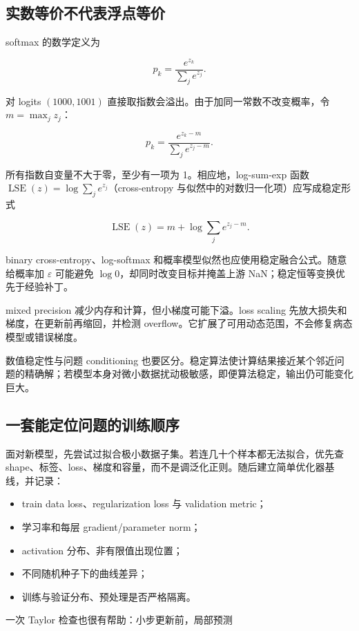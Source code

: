 \subsection{实数等价不代表浮点等价}

softmax 的数学定义为

\[
p_k=\frac{e^{z_k}}{\sum_je^{z_j}}.
\]

对 logits \((1000,1001)\) 直接取指数会溢出。由于加同一常数不改变概率，令 \(m=\max_jz_j\)：

\[
p_k
=\frac{e^{z_k-m}}{\sum_je^{z_j-m}}.
\]

所有指数自变量不大于零，至少有一项为 1。相应地，log-sum-exp 函数 \(\operatorname{LSE}(z)=\log\sum_je^{z_j}\)（cross-entropy 与似然中的对数归一化项）应写成稳定形式

\[
\operatorname{LSE}(z)
=m+\log\sum_je^{z_j-m}.
\]

binary cross-entropy、log-softmax 和概率模型似然也应使用稳定融合公式。随意给概率加 \(\varepsilon\) 可能避免 \(\log0\)，却同时改变目标并掩盖上游 NaN；稳定恒等变换优先于经验补丁。

mixed precision 减少内存和计算，但小梯度可能下溢。loss scaling 先放大损失和梯度，在更新前再缩回，并检测 overflow。它扩展了可用动态范围，不会修复病态模型或错误梯度。

数值稳定性与问题 conditioning 也要区分。稳定算法使计算结果接近某个邻近问题的精确解；若模型本身对微小数据扰动极敏感，即便算法稳定，输出仍可能变化巨大。

\subsection{一套能定位问题的训练顺序}

面对新模型，先尝试过拟合极小数据子集。若连几十个样本都无法拟合，优先查 shape、标签、loss、梯度和容量，而不是调泛化正则。随后建立简单优化器基线，并记录：

\begin{itemize}
\tightlist
\item
  train data loss、regularization loss 与 validation metric；
\item
  学习率和每层 gradient/parameter norm；
\item
  activation 分布、非有限值出现位置；
\item
  不同随机种子下的曲线差异；
\item
  训练与验证分布、预处理是否严格隔离。
\end{itemize}

一次 Taylor 检查也很有帮助：小步更新前，局部预测

